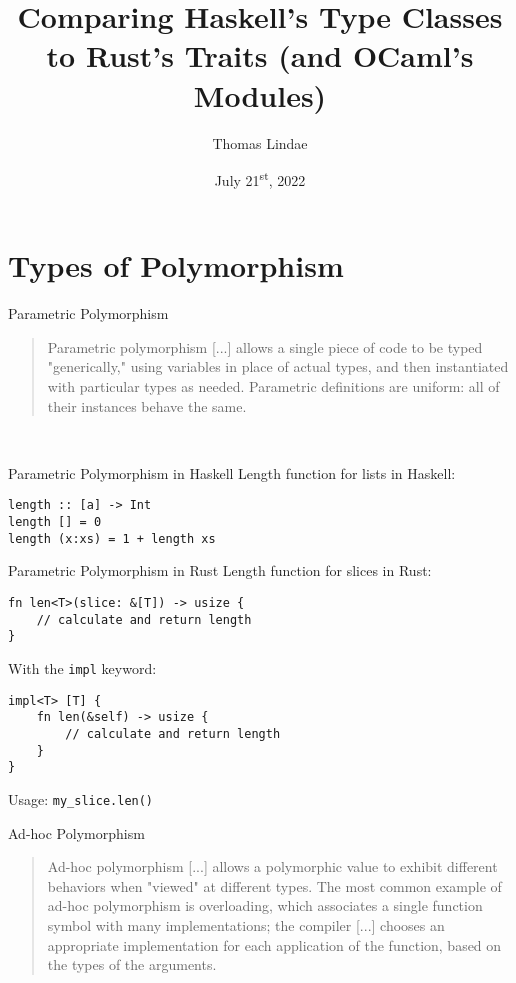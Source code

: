 \documentclass[
  english,            %
  aspectratio=169,    %
]{tumbeamer}
\title[Comparing Type Classes and Traits]{Comparing Haskell's Type Classes to Rust's Traits (and OCaml's Modules)}
\subtitle{}
\author{Thomas Lindae}
\institute{\theChairName\\\theDepartmentName\\\theUniversityName}
\date[2022-07-21]{July 21\textsuperscript{st}, 2022}
\begin{document}
\maketitle

\section{Types of Polymorphism}

\begin{frame}[fragile]{Parametric Polymorphism}
\begin{quote}Parametric polymorphism [...] allows a single piece of code to be typed "generically," using variables in place of actual types, and then instantiated with particular types as needed. Parametric definitions are uniform: all of their instances behave the same.
\end{quote}~
\end{frame}

\begin{frame}[fragile]{Parametric Polymorphism in Haskell}
Length function for lists in Haskell:
\begin{verbatim}
length :: [a] -> Int
length [] = 0
length (x:xs) = 1 + length xs
\end{verbatim}
\end{frame}

\begin{frame}[fragile]{Parametric Polymorphism in Rust}
Length function for slices in Rust:
\begin{verbatim}
fn len<T>(slice: &[T]) -> usize {
    // calculate and return length
}
\end{verbatim}

\pause \vspace{3mm}
With the \verb|impl| keyword:
\begin{verbatim}
impl<T> [T] {
    fn len(&self) -> usize {
        // calculate and return length
    }
}
\end{verbatim}
Usage: \texttt{my_slice.len()}
\end{frame}

\begin{frame}[fragile]{Ad-hoc Polymorphism}
\begin{quote}
Ad-hoc polymorphism [...] allows a polymorphic value to exhibit different behaviors when "viewed" at different types. The most common example of ad-hoc polymorphism is overloading, which associates a single function symbol with many implementations; the compiler [...] chooses an appropriate implementation for each application of the function, based on the types of the arguments.
\end{quote}~
\end{frame}
\end{document}
